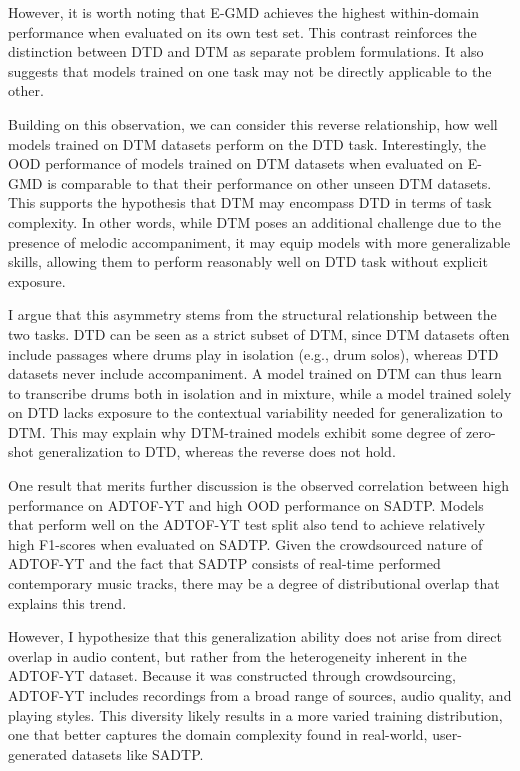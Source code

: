 However, it is worth noting that E-GMD achieves the highest within-domain performance when evaluated on its own test set. This contrast reinforces the distinction between \gls{DTD} and \gls{DTM} as separate problem formulations. It also suggests that models trained on one task may not be directly applicable to the other.

Building on this observation, we can consider this reverse relationship, how well models trained on \gls{DTM} datasets perform on the \gls{DTD} task. Interestingly, the \gls{OOD} performance of models trained on \gls{DTM} datasets when evaluated on E-GMD is comparable to that their performance on other unseen \gls{DTM} datasets. This supports the hypothesis that \gls{DTM} may encompass \gls{DTD} in terms of task complexity. In other words, while \gls{DTM} poses an additional challenge due to the presence of melodic accompaniment, it may equip models with more generalizable skills, allowing them to perform reasonably well on \gls{DTD} task without explicit exposure.

I argue that this asymmetry stems from the structural relationship between the two tasks. \gls{DTD} can be seen as a strict subset of \gls{DTM}, since \gls{DTM} datasets often include passages where drums play in isolation (e.g., drum solos), whereas \gls{DTD} datasets never include accompaniment. A model trained on \gls{DTM} can thus learn to transcribe drums both in isolation and in mixture, while a model trained solely on \gls{DTD} lacks exposure to the contextual variability needed for generalization to \gls{DTM}. This may explain why \gls{DTM}-trained models exhibit some degree of zero-shot generalization to \gls{DTD}, whereas the reverse does not hold.

One result that merits further discussion is the observed correlation between high performance on ADTOF-YT and high \gls{OOD} performance on SADTP. Models that perform well on the ADTOF-YT test split also tend to achieve relatively high F1-scores when evaluated on SADTP. Given the crowdsourced nature of ADTOF-YT and the fact that SADTP consists of real-time performed contemporary music tracks, there may be a degree of distributional overlap that explains this trend.

However, I hypothesize that this generalization ability does not arise from direct overlap in audio content, but rather from the heterogeneity inherent in the ADTOF-YT dataset. Because it was constructed through crowdsourcing, ADTOF-YT includes recordings from a broad range of sources, audio quality, and playing styles. This diversity likely results in a more varied training distribution, one that better captures the domain complexity found in real-world, user-generated datasets like SADTP.

